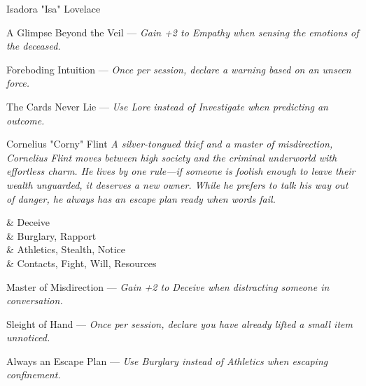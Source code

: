 \begin{multicols}{2}
\begin{WyrdNPC}{Isadora "Isa" Lovelace}
	\begin{TraitsBox}
	  \item[A Glimpse Beyond the Veil] — \emph{Gain +2 to Empathy when sensing the emotions of the deceased.}
	  \item[Foreboding Intuition] — \emph{Once per session, declare a warning based on an unseen force.}
	  \item[The Cards Never Lie] — \emph{Use Lore instead of Investigate when predicting an outcome.}
	\end{TraitsBox}
  \end{WyrdNPC}
  

  \begin{WyrdNPC}{Cornelius "Corny" Flint}
	\emph{A silver-tongued thief and a master of misdirection, Cornelius Flint moves between high society and the criminal underworld with effortless charm. He lives by one rule—if someone is foolish enough to leave their wealth unguarded, it deserves a new owner. While he prefers to talk his way out of danger, he always has an escape plan ready when words fail.}
  
	\vspace{0.5\baselineskip}

	\begin{SkillsBox}
		\Expert & Deceive \\
		\Skilled & Burglary, Rapport \\
		\Novice & Athletics, Stealth, Notice \\
		\Untrained & Contacts, Fight, Will, Resources \\
	\end{SkillsBox}
  
	\begin{TraitsBox}
	  \item[Master of Misdirection] — \emph{Gain +2 to Deceive when distracting someone in conversation.}
	  \item[Sleight of Hand] — \emph{Once per session, declare you have already lifted a small item unnoticed.}
	  \item[Always an Escape Plan] — \emph{Use Burglary instead of Athletics when escaping confinement.}
	\end{TraitsBox}
	\end{WyrdNPC}
  
  \end{multicols}

\EndBoxPage


